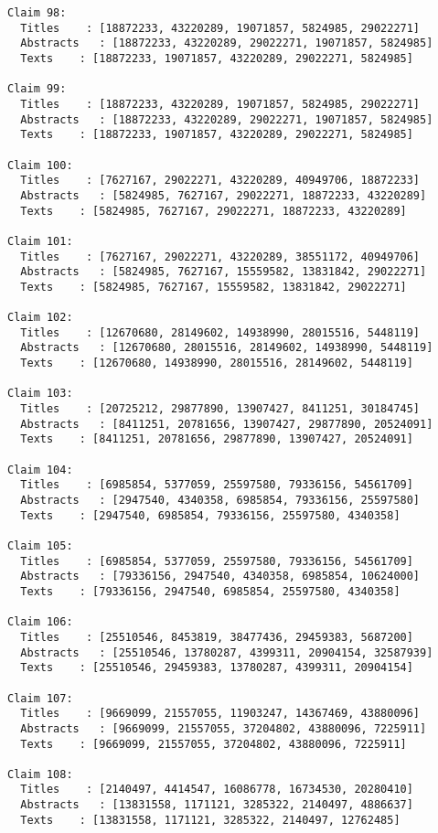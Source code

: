 \documentclass[11pt]{article}
\begin{document}
\begin{Verbatim}[commandchars=\\\{\}]
Claim 98:
  Titles    : [18872233, 43220289, 19071857, 5824985, 29022271]
  Abstracts   : [18872233, 43220289, 29022271, 19071857, 5824985]
  Texts    : [18872233, 19071857, 43220289, 29022271, 5824985]

Claim 99:
  Titles    : [18872233, 43220289, 19071857, 5824985, 29022271]
  Abstracts   : [18872233, 43220289, 29022271, 19071857, 5824985]
  Texts    : [18872233, 19071857, 43220289, 29022271, 5824985]

Claim 100:
  Titles    : [7627167, 29022271, 43220289, 40949706, 18872233]
  Abstracts   : [5824985, 7627167, 29022271, 18872233, 43220289]
  Texts    : [5824985, 7627167, 29022271, 18872233, 43220289]

Claim 101:
  Titles    : [7627167, 29022271, 43220289, 38551172, 40949706]
  Abstracts   : [5824985, 7627167, 15559582, 13831842, 29022271]
  Texts    : [5824985, 7627167, 15559582, 13831842, 29022271]

Claim 102:
  Titles    : [12670680, 28149602, 14938990, 28015516, 5448119]
  Abstracts   : [12670680, 28015516, 28149602, 14938990, 5448119]
  Texts    : [12670680, 14938990, 28015516, 28149602, 5448119]

Claim 103:
  Titles    : [20725212, 29877890, 13907427, 8411251, 30184745]
  Abstracts   : [8411251, 20781656, 13907427, 29877890, 20524091]
  Texts    : [8411251, 20781656, 29877890, 13907427, 20524091]

Claim 104:
  Titles    : [6985854, 5377059, 25597580, 79336156, 54561709]
  Abstracts   : [2947540, 4340358, 6985854, 79336156, 25597580]
  Texts    : [2947540, 6985854, 79336156, 25597580, 4340358]

Claim 105:
  Titles    : [6985854, 5377059, 25597580, 79336156, 54561709]
  Abstracts   : [79336156, 2947540, 4340358, 6985854, 10624000]
  Texts    : [79336156, 2947540, 6985854, 25597580, 4340358]

Claim 106:
  Titles    : [25510546, 8453819, 38477436, 29459383, 5687200]
  Abstracts   : [25510546, 13780287, 4399311, 20904154, 32587939]
  Texts    : [25510546, 29459383, 13780287, 4399311, 20904154]

Claim 107:
  Titles    : [9669099, 21557055, 11903247, 14367469, 43880096]
  Abstracts   : [9669099, 21557055, 37204802, 43880096, 7225911]
  Texts    : [9669099, 21557055, 37204802, 43880096, 7225911]

Claim 108:
  Titles    : [2140497, 4414547, 16086778, 16734530, 20280410]
  Abstracts   : [13831558, 1171121, 3285322, 2140497, 4886637]
  Texts    : [13831558, 1171121, 3285322, 2140497, 12762485]


\end{Verbatim}
\end{document}
